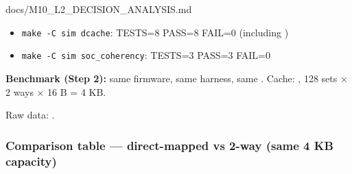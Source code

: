\begin{relocated}{docs/M10_L2_DECISION_ANALYSIS.md}
\begin{itemize}
\tightlist
\item
  \texttt{make\ -\allowbreak{}C\ sim\ dcache}: TESTS=8 PASS=8 FAIL=0
  (including )
\item
  \texttt{make\ -\allowbreak{}C\ sim\ soc\_\allowbreak{}coherency}:
  TESTS=3 PASS=3 FAIL=0
\end{itemize}

\textbf{Benchmark (Step 2):} same  firmware, same
 harness, same .
Cache: , 128 sets × 2 ways × 16 B = 4 KB.

Raw data: .

\subsubsection{Comparison table --- direct-mapped vs 2-way (same 4
KB capacity)}\label{tm:dec:m10-l2:51-comparison-table-direct-mapped-vs-2-way-same-4-kb-capacity}


\end{relocated}
